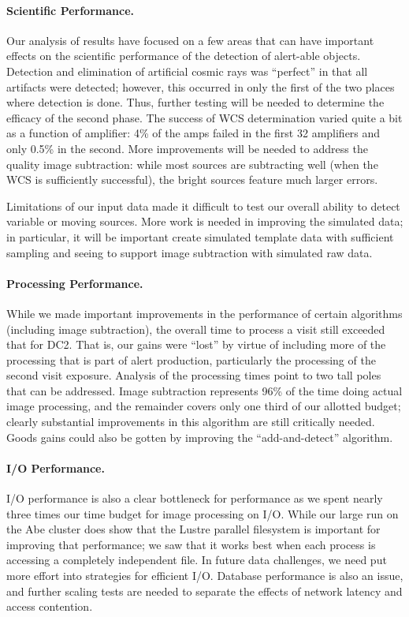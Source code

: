 \paragraph{Scientific Performance.}  Our analysis of results have
focused on a few areas that can have important effects on the scientific
performance of the detection of alert-able objects.  Detection and
elimination of artificial cosmic rays was ``perfect'' in that all
artifacts were detected; however, this occurred in only the first of
the two places where detection is done.  Thus, further testing will be
needed to determine the efficacy of the second phase.  The success of
WCS determination varied quite a bit as a function of amplifier: 4\%
of the amps failed in the first 32 amplifiers and only 0.5\% in the
second.  More improvements will be needed to address the quality image
subtraction:  while most sources are subtracting well (when the WCS is
sufficiently successful),  the bright sources feature much larger
errors.  

Limitations of our input data made it difficult to test our overall
ability to detect variable or moving sources.  More work is needed in
improving the simulated data; in particular, it will be important
create simulated template data with sufficient sampling and seeing to
support image subtraction with simulated raw data.  

\paragraph{Processing Performance.}  While we made important
improvements in the performance of certain algorithms (including image
subtraction), the overall time to process a visit still exceeded that
for DC2.  That is, our gains were ``lost'' by virtue of
including more of the processing that is part of alert production,
particularly the processing of the second visit exposure.  Analysis of
the processing times point to two tall poles that can be addressed.
Image subtraction represents 96\% of the time doing actual image
processing, and the remainder covers only one third of our allotted
budget; clearly substantial improvements in this algorithm are still
critically needed.  Goods gains could also be gotten by improving the
``add-and-detect'' algorithm.  

\paragraph{I/O Performance.}  I/O performance is also a clear
bottleneck for performance as we spent nearly three times our time
budget for image processing on I/O.  While our large run on the Abe
cluster does show that the Lustre parallel filesystem is important
for improving that performance; we saw that it works best when each
process is accessing a completely independent file.  In future data
challenges, we need put more effort into strategies for efficient I/O.
Database performance is also an issue, and further scaling tests are
needed to separate the effects of network latency and access
contention.  

